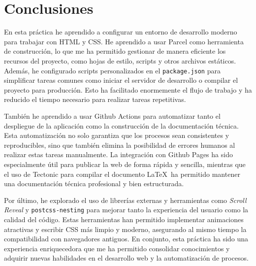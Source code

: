 \documentclass{article}
\begin{document}
\section{Conclusiones}\label{sec:conclusiones}

En esta práctica he aprendido a configurar un entorno de desarrollo moderno para trabajar con HTML y CSS. He aprendido a usar Parcel como herramienta de construcción, lo que me ha permitido gestionar de manera eficiente los recursos del proyecto, como hojas de estilo, scripts y otros archivos estáticos. Además, he configurado scripts personalizados en el \lstinline|package.json| para simplificar tareas comunes como iniciar el servidor de desarrollo o compilar el proyecto para producción. Esto ha facilitado enormemente el flujo de trabajo y ha reducido el tiempo necesario para realizar tareas repetitivas.

También he aprendido a usar Github Actions para automatizar tanto el despliegue de la aplicación como la construcción de la documentación técnica. Esta automatización no solo garantiza que los procesos sean consistentes y reproducibles, sino que también elimina la posibilidad de errores humanos al realizar estas tareas manualmente. La integración con Github Pages ha sido especialmente útil para publicar la web de forma rápida y sencilla, mientras que el uso de Tectonic para compilar el documento \LaTeX\ ha permitido mantener una documentación técnica profesional y bien estructurada.

Por último, he explorado el uso de librerías externas y herramientas como \textit{Scroll Reveal} y \lstinline|postcss-nesting| para mejorar tanto la experiencia del usuario como la calidad del código. Estas herramientas han permitido implementar animaciones atractivas y escribir CSS más limpio y moderno, asegurando al mismo tiempo la compatibilidad con navegadores antiguos. En conjunto, esta práctica ha sido una experiencia enriquecedora que me ha permitido consolidar conocimientos y adquirir nuevas habilidades en el desarrollo web y la automatización de procesos.
\end{document}
